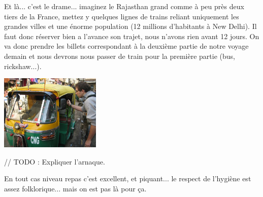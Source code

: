 \begin{multicols}{2}
Et là... c’est le drame... imaginez le Rajasthan grand comme à peu près deux tiers de la France, mettez y quelques lignes de trains reliant uniquement les grandes villes et une énorme population (12 millions d'habitants à New Delhi). Il faut donc réserver bien a l’avance son trajet, nous n’avons rien avant 12 jours.
On va donc prendre les billets correspondant à la deuxième partie de notre voyage demain et nous devrons nous passer de train pour la première partie (bus, rickshaw...).

\hspace*{-0.65cm}
\includegraphics[width=4.8cm]{articles/Des-indiens-dans-la-ville/ricksaw.jpg}

// TODO : Expliquer l'arnaque.

En tout cas niveau repas c’est excellent, et piquant... le respect de l’hygiène est assez folklorique... mais on est pas là pour ça.


\end{multicols}

\pagebreak
